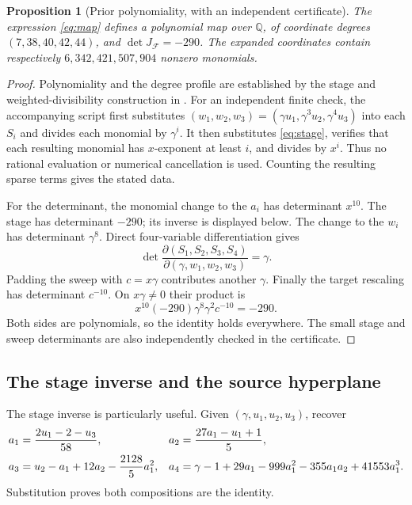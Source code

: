 \documentclass[11pt,a4paper]{article}
\newtheorem{proposition}[theorem]{Proposition}
\theoremstyle{definition}
\newcommand{\Q}{\mathbb Q}
\newcommand{\F}{\mathcal F}
\begin{document}
\begin{proposition}[Prior polynomiality, with an independent certificate]
\label{prop:keller}
The expression \eqref{eq:map} defines a polynomial map over $\Q$, of
coordinate degrees $(7,38,40,42,44)$, and
$\det J_{\F}=-290$. The expanded coordinates contain respectively
$6,342,421,507,904$ nonzero monomials.
\end{proposition}
\begin{proof}
Polynomiality and the degree profile are established by the stage and
weighted-divisibility construction in \cite[Theorem 4.5]{Gao}.
For an independent finite check, the accompanying script first substitutes
$(w_1,w_2,w_3)=(\gamma u_1,\gamma^3u_2,\gamma^4u_3)$ into each $S_i$
and divides each monomial by $\gamma^i$. It then substitutes
\eqref{eq:stage}, verifies that each resulting monomial has $x$-exponent
at least $i$, and divides by $x^i$. Thus no rational evaluation or
numerical cancellation is used. Counting the resulting sparse terms gives
the stated data.

For the determinant, the monomial change to the $a_i$ has determinant
$x^{10}$. The stage has determinant $-290$; its inverse is displayed
below. The change to the $w_i$ has determinant $\gamma^8$. Direct
four-variable differentiation gives
\[
 \det\frac{\partial(S_1,S_2,S_3,S_4)}
               {\partial(\gamma,w_1,w_2,w_3)}=\gamma.
\]
Padding the sweep with $c=x\gamma$ contributes another $\gamma$.
Finally the target rescaling has determinant $c^{-10}$. On
$x\gamma\ne0$ their product is
\[
 x^{10}(-290)\gamma^8\gamma^2c^{-10}=-290.
\]
Both sides are polynomials, so the identity holds everywhere. The small
stage and sweep determinants are also independently checked in the
certificate.
\end{proof}

\subsection{The stage inverse and the source hyperplane}
The stage inverse is particularly useful. Given
$(\gamma,u_1,u_2,u_3)$, recover
\begin{align}
 a_1&=\frac{2u_1-2-u_3}{58},&
 a_2&=\frac{27a_1-u_1+1}{5},\notag\\
 a_3&=u_2-a_1+12a_2-\frac{2128}{5}a_1^2,&
 a_4&=\gamma-1+29a_1-999a_1^2-355a_1a_2+41553a_1^3.
 \label{eq:stageinverse}
\end{align}
Substitution proves both compositions are the identity.
\end{document}

